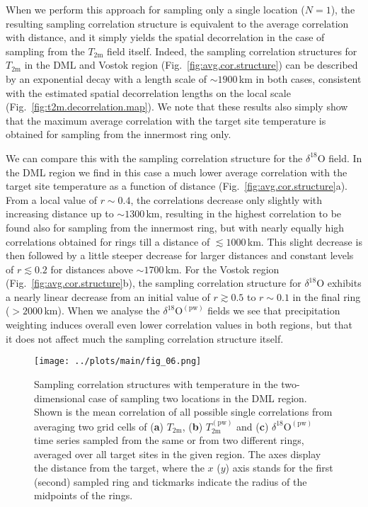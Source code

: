 \documentclass[cp, manuscript]{copernicus}
\begin{document}
When we perform this approach for sampling only a single location ($N=1$), the
resulting sampling correlation structure is equivalent to the average
correlation with distance, and it simply yields the spatial decorrelation in the
case of sampling from the $T_{\mathrm{2m}}$ field itself. Indeed, the sampling
correlation structures for $T_{\mathrm{2m}}$ in the DML and Vostok region
(Fig.~\ref{fig:avg.cor.structure}) can be described by an exponential decay with
a length scale of $\sim1900$\,km in both cases, consistent with the estimated
spatial decorrelation lengths on the local scale
(Fig.~\ref{fig:t2m.decorrelation.map}). We note that these results also
simply show that the maximum average correlation with the target site
temperature is obtained for sampling from the innermost ring only.

We can compare this with the sampling correlation structure for the
$\delta^{18}\mathrm{O}$ field. In the DML region we find in this case a much
lower average correlation with the target site temperature as a function of
distance (Fig.~\ref{fig:avg.cor.structure}a). From a local value of $r\sim0.4$,
the correlations decrease only slightly with increasing distance up to
$\sim1300$\,km, resulting in the highest correlation to be found also for
sampling from the innermost ring, but with nearly equally high correlations
obtained for rings till a distance of $\lesssim1000$\,km. This slight decrease
is then followed by a little steeper decrease for larger distances and constant
levels of $r\lesssim0.2$ for distances above $\sim1700$\,km. For the Vostok
region (Fig.~\ref{fig:avg.cor.structure}b), the sampling correlation structure
for $\delta^{18}\mathrm{O}$ exhibits a nearly linear decrease from an initial
value of $r\gtrsim0.5$ to $r\sim0.1$ in the final ring ($>2000$\,km).
When we analyse the $\delta^{18}\mathrm{O}^{\mathrm{(pw)}}$ fields we see that
precipitation weighting induces overall even lower correlation values in both
regions, but that it does not affect much the sampling correlation structure
itself.

\begin{figure*}[t]%
\centering
\texttt{[image: ../plots/main/fig\_06.png]}
\caption{%
  Sampling correlation structures with temperature in the two-dimensional case
  of sampling two locations in the DML region. Shown is the mean correlation of
  all possible single correlations from averaging two grid cells of (\textbf{a})
  $T_{\mathrm{2m}}$, (\textbf{b}) $T_{\mathrm{2m}}^{\mathrm{(pw)}}$ and
  (\textbf{c}) $\delta^{18}\mathrm{O}^{\mathrm{(pw)}}$ time series sampled from
  the same or from two different rings, averaged over all target sites in the
  given region. The axes display the distance from the target, where the $x$
  ($y$) axis stands for the first (second) sampled ring and tickmarks indicate
  the radius of the midpoints of the rings.}
\label{fig:two-core-correlation}%
\end{figure*}%
\end{document}
